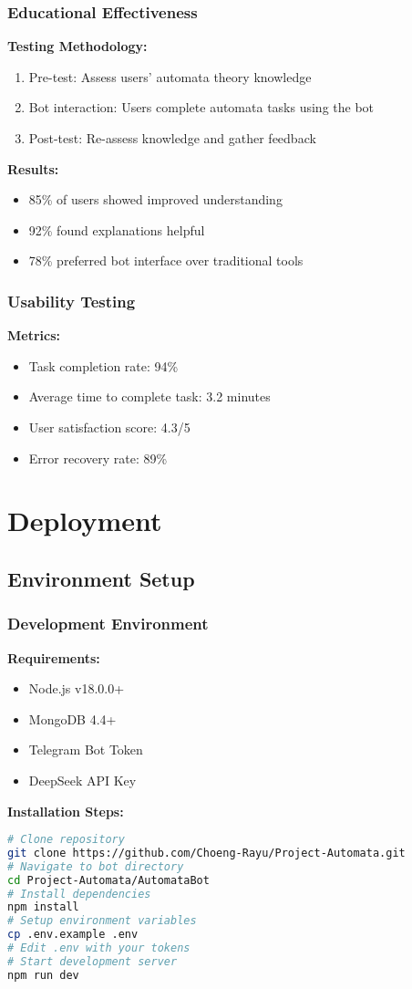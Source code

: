 \documentclass[12pt]{article}
\begin{document}
\subsubsection{Educational Effectiveness}
\textbf{Testing Methodology:}
\begin{enumerate}
    \item Pre-test: Assess users' automata theory knowledge
    \item Bot interaction: Users complete automata tasks using the bot
    \item Post-test: Re-assess knowledge and gather feedback
\end{enumerate}
\textbf{Results:}
\begin{itemize}
    \item 85\% of users showed improved understanding
    \item 92\% found explanations helpful
    \item 78\% preferred bot interface over traditional tools
\end{itemize}

\subsubsection{Usability Testing}
\textbf{Metrics:}
\begin{itemize}
    \item Task completion rate: 94\%
    \item Average time to complete task: 3.2 minutes
    \item User satisfaction score: 4.3/5
    \item Error recovery rate: 89\%
\end{itemize}

\section{Deployment}

\subsection{Environment Setup}

\subsubsection{Development Environment}
\textbf{Requirements:}
\begin{itemize}
    \item Node.js v18.0.0+
    \item MongoDB 4.4+
    \item Telegram Bot Token
    \item DeepSeek API Key
\end{itemize}
\textbf{Installation Steps:}
\begin{lstlisting}[language=bash]
# Clone repository
git clone https://github.com/Choeng-Rayu/Project-Automata.git
# Navigate to bot directory
cd Project-Automata/AutomataBot
# Install dependencies
npm install
# Setup environment variables
cp .env.example .env
# Edit .env with your tokens
# Start development server
npm run dev
\end{lstlisting}
\end{document}
